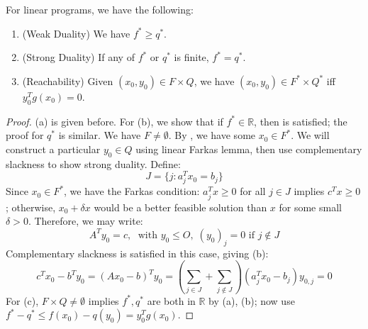 \begin{prop}\label{prop:043-linear-strong-duality}For linear programs, we have the following:
	\begin{enumerate}[label=(\alph*)]
		\item (Weak Duality) We have $f^\ast\geq q^\ast$.
		\item (Strong Duality) If any of $f^\ast$ or $q^\ast$ is finite, $f^\ast=q^\ast$.
		\item (Reachability) Given $(x_0,y_0)\in F\times Q$, we have $(x_0,y_0)\in F^\ast\times Q^\ast$ iff $y_0^Tg(x_0)=0$.
	\end{enumerate}
\end{prop}

\begin{proof}
	(a) is given before. For (b), we show that if $f^\ast\in \mathbb{R}$, then  is satisfied; the proof for $q^\ast$ is similar. We have $F\neq \emptyset$. By , we have some $x_0\in F^\ast$. We will construct a particular $y_0\in Q$ using linear Farkas lemma, then use complementary slackness to show strong duality. Define:
	\[
		J=\{j:a_j^Tx_0=b_j\}
	\]
	Since $x_0\in F^\ast$, we have the Farkas condition: $a_j^Tx\geq 0$ for all $j\in J$ implies $c^Tx\geq 0$; otherwise, $x_0+\delta x$ would be a better feasible solution than $x$ for some small $\delta>0$. Therefore, we may write:
	\[
		A^Ty_0=c,\; \text{ with }y_0\leq O,\;(y_0)_j=0\text{ if }j\notin J
	\]
	Complementary slackness is satisfied in this case, giving (b):
	\[
		c^Tx_0-b^Ty_0=(Ax_0-b)^Ty_0=\left(\sum_{j\in J}+\sum_{j\notin J}\right)(a_j^Tx_0-b_j)y_{0,j}=0
	\]
	For (c), $F\times Q\neq\emptyset$ implies $f^\ast,q^\ast$ are both in $\mathbb{R}$ by (a), (b); now use $f^\ast-q^\ast\leq f(x_0)-q(y_0)=y_0^Tg(x_0)$.
\end{proof}

